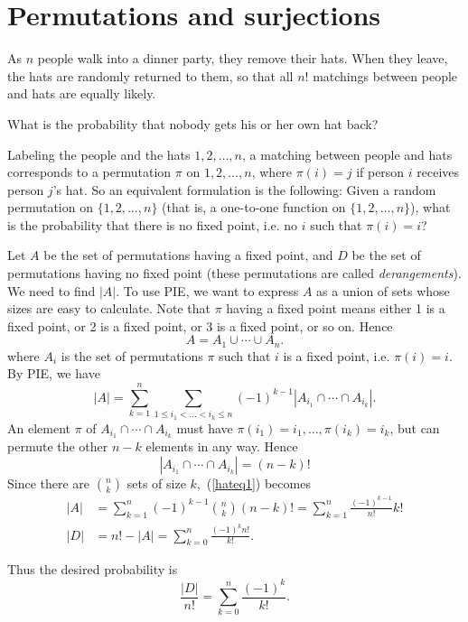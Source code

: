 \section{Permutations and surjections}
\begin{ex}
As $n$ people walk into a dinner party, they remove their hats. When they leave, the hats are randomly returned to them, so that all $n!$ matchings between people and hats are equally likely.

What is the probability that nobody gets his or her own hat back?
\end{ex}
Labeling the people and the hats $1,2,\ldots, n$, a matching between people and hats corresponds to a permutation $\pi$ on $1,2,\ldots, n$, where $\pi(i)=j$ if person $i$ receives person $j$'s hat. 
So an equivalent formulation is the following: Given a random permutation 
on $\{1,2,\ldots, n\}$ (that is, a one-to-one function on $\{1,2,\ldots, n\}$), what is the probability that there is no fixed point, i.e. no $i$ such that $\pi(i)=i$?

Let $A$ be the set of permutations having a fixed point, and $D$ be the set of permutations having no fixed point (these permutations are called {\it derangements}).
We need to find $|A|$. To use PIE, we want to express $A$ as a union of sets whose sizes are easy to calculate. Note that $\pi$ having a fixed point means either 1 is a fixed point, or 2 is a fixed point, or 3 is a fixed point, or so on. Hence
\[
A=A_1\cup \cdots \cup A_n.
\]
where $A_i$ is the set of permutations $\pi$ such that $i$ is a fixed point, i.e. $\pi(i)=i$. By PIE, we have
\begin{equation}\label{hateq1}
|A|=\sum_{k=1}^n \sum_{1\le i_1<\ldots< i_k\le n} (-1)^{k-1} |A_{i_1}\cap \cdots \cap A_{i_k}|.
\end{equation}
An element $\pi$ of $A_{i_1}\cap \cdots \cap A_{i_k}$ must have $\pi(i_1)=i_1,\ldots, \pi(i_k)=i_k$, but can permute the other $n-k$ elements in any way. Hence 
\[
|A_{i_1}\cap \cdots \cap A_{i_k}|=(n-k)!
\]
Since there are $\binom nk$ sets of size $k$,~(\ref{hateq1}) becomes
\begin{align*}
|A|&=\sum_{k=1}^n (-1)^{k-1}\binom nk (n-k)!=\sum_{k=1}^n \frac{(-1)^{k-1}}{n!}{k!}\\
|D|&=n!-|A|=\sum_{k=0}^n \frac{(-1)^{k}n!}{k!}.
\end{align*}

Thus the desired probability is
\[
\frac{|D|}{n!}=\sum_{k=0}^n \frac{(-1)^{k}}{k!}.
\]

